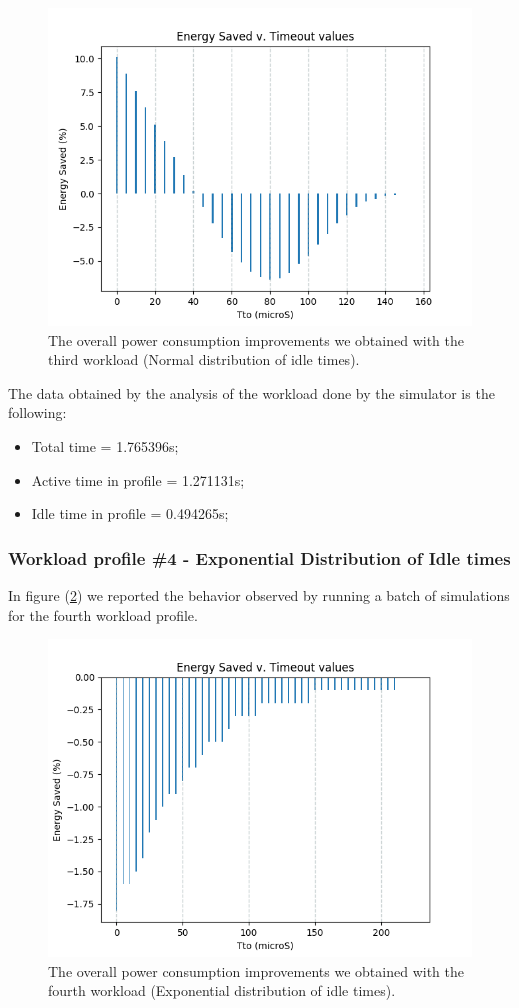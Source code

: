 \documentclass[a4paper]{article}
\begin{document}
            \begin{figure}[htp]
                \centering
                \includegraphics[width=0.5 \columnwidth]{./screenshots/Idle_case3.png}
                \caption{
                        \label{fig:Idle_case3}
                        The overall power consumption improvements we obtained with the third workload (Normal distribution of idle times).
                }
            \end{figure}

            The data obtained by the analysis of the workload done by the simulator is the following:
            \begin{itemize}
                \item Total time = 1.765396s;
                \item Active time in profile = 1.271131s;
                \item Idle time in profile = 0.494265s;
            \end{itemize}

        \subsubsection{Workload profile \#4 - Exponential Distribution of Idle times}
            In figure (\ref{fig:Idle_case4}) we reported the behavior observed by running a batch of simulations for the fourth workload profile.

            \begin{figure}[htp]
                \centering
                \includegraphics[width=0.5 \columnwidth]{./screenshots/Idle_case4.png}
                \caption{
                        \label{fig:Idle_case4}
                        The overall power consumption improvements we obtained with the fourth workload (Exponential distribution of idle times).
                }
            \end{figure}
\end{document}
